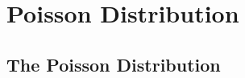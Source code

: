 \documentclass[../alevelmaths.tex]{subfiles}
\begin{document}
\chapter{Poisson Distribution}
\section{The Poisson Distribution}
\end{document}
